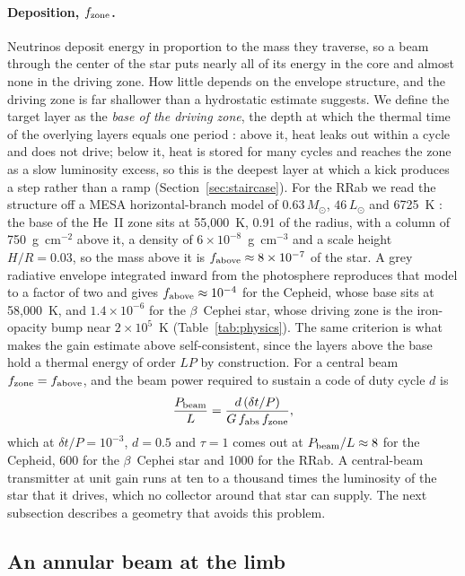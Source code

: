 \documentclass[final,5p]{elsarticle}
\newcommand{\dtp}{\ensuremath{\delta t/P}}
\newcommand{\Lsun}{\ensuremath{L_\odot}}
\newcommand{\Msun}{\ensuremath{M_\odot}}
\newcommand{\bcep}{\ensuremath{\beta}~Cephei}
\newcommand{\pbeam}{\ensuremath{P_{\rm beam}}}
\begin{document}
\paragraph{Deposition, $f_{\rm zone}$.} Neutrinos deposit energy in proportion to the mass they traverse, so a beam through the center of the star puts nearly all of its energy in the core and almost none in the driving zone. How little depends on the envelope structure, and the driving zone is far shallower than a hydrostatic estimate suggests. We define the target layer as the \emph{base of the driving zone}, the depth at which the thermal time of the overlying layers equals one period \citep[the transition-region criterion of][]{Cox1980}: above it, heat leaks out within a cycle and does not drive; below it, heat is stored for many cycles and reaches the zone as a slow luminosity excess, so this is the deepest layer at which a kick produces a step rather than a ramp (Section~\ref{sec:staircase}). For the RRab we read the structure off a MESA horizontal-branch model of $0.63\,\Msun$, $46\,\Lsun$ and 6725~K \citep{Zenodo15741530}: the base of the He~II zone sits at 55{,}000~K, 0.91 of the radius, with a column of 750~g~cm$^{-2}$ above it, a density of $6\times10^{-8}$~g~cm$^{-3}$ and a scale height $H/R=0.03$, so the mass above it is $f_{\rm above}\approx8\times10^{-7}$ of the star. A grey radiative envelope integrated inward from the photosphere reproduces that model to a factor of two and gives $f_{\rm above}\approx10^{-4}$ for the Cepheid, whose base sits at 58{,}000~K, and $1.4\times10^{-6}$ for the \bcep{} star, whose driving zone is the iron-opacity bump near $2\times10^{5}$~K (Table~\ref{tab:physics}). The same criterion is what makes the gain estimate above self-consistent, since the layers above the base hold a thermal energy of order $LP$ by construction. For a central beam $f_{\rm zone}=f_{\rm above}$, and the beam power required to sustain a code of duty cycle $d$ is
\begin{equation}
  \frac{\pbeam}{L} = \frac{d\,(\dtp)}{G\, f_{\rm abs}\, f_{\rm zone}} ,
  \label{eq:pbeam}
\end{equation}
which at $\dtp=10^{-3}$, $d=0.5$ and $\tau=1$ comes out at $\pbeam/L\approx8$ for the Cepheid, 600 for the \bcep{} star and 1000 for the RRab. A central-beam transmitter at unit gain runs at ten to a thousand times the luminosity of the star that it drives, which no collector around that star can supply. The next subsection describes a geometry that avoids this problem.

\subsection{An annular beam at the limb}
\label{sec:annulus}
\end{document}
